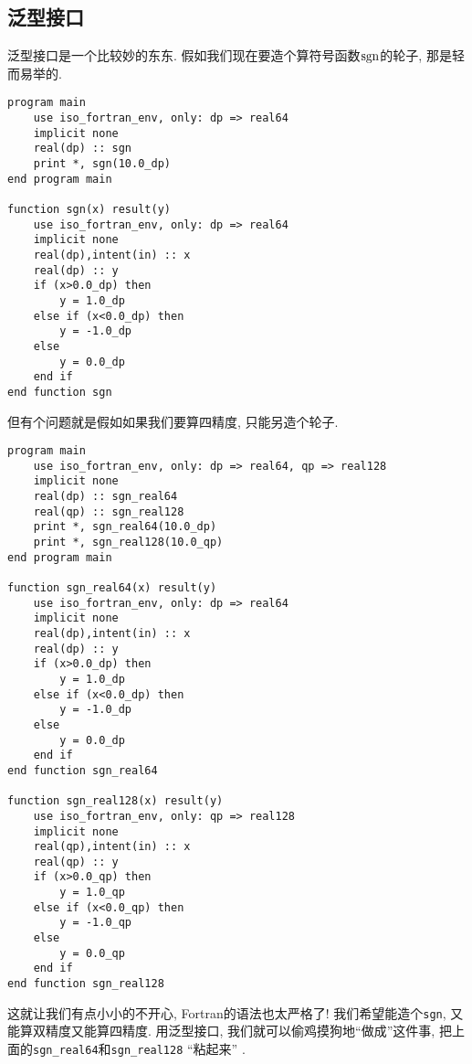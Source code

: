 \subsection{泛型接口}

泛型接口是一个比较妙的东东. 假如我们现在要造个算符号函数$\operatorname{sgn}$的轮子, 那是轻而易举的.
\begin{lstlisting}
program main
    use iso_fortran_env, only: dp => real64
    implicit none
    real(dp) :: sgn
    print *, sgn(10.0_dp)
end program main

function sgn(x) result(y)
    use iso_fortran_env, only: dp => real64
    implicit none
    real(dp),intent(in) :: x
    real(dp) :: y
    if (x>0.0_dp) then
        y = 1.0_dp
    else if (x<0.0_dp) then
        y = -1.0_dp
    else
        y = 0.0_dp
    end if
end function sgn
\end{lstlisting}
但有个问题就是假如如果我们要算四精度, 只能另造个轮子.
\begin{lstlisting}
program main
    use iso_fortran_env, only: dp => real64, qp => real128
    implicit none
    real(dp) :: sgn_real64
    real(qp) :: sgn_real128
    print *, sgn_real64(10.0_dp)
    print *, sgn_real128(10.0_qp)
end program main

function sgn_real64(x) result(y)
    use iso_fortran_env, only: dp => real64
    implicit none
    real(dp),intent(in) :: x
    real(dp) :: y
    if (x>0.0_dp) then
        y = 1.0_dp
    else if (x<0.0_dp) then
        y = -1.0_dp
    else
        y = 0.0_dp
    end if
end function sgn_real64

function sgn_real128(x) result(y)
    use iso_fortran_env, only: qp => real128
    implicit none
    real(qp),intent(in) :: x
    real(qp) :: y
    if (x>0.0_qp) then
        y = 1.0_qp
    else if (x<0.0_qp) then
        y = -1.0_qp
    else
        y = 0.0_qp
    end if
end function sgn_real128
\end{lstlisting}
这就让我们有点小小的不开心, Fortran的语法也太严格了! 我们希望能造个\texttt{sgn}, 又能算双精度又能算四精度. 用泛型接口, 我们就可以偷鸡摸狗地``做成''这件事, 把上面的\texttt{sgn\_{}real64}和\texttt{sgn\_{}real128} ``粘起来'' .

